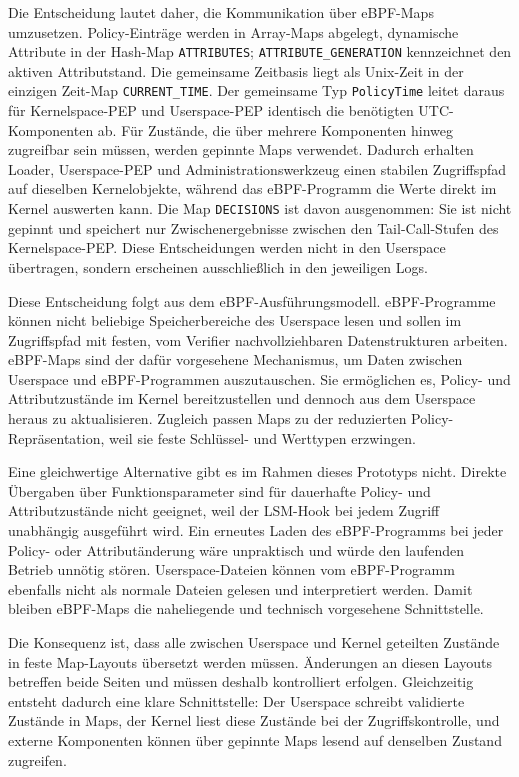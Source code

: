Die Entscheidung lautet daher, die Kommunikation über eBPF-Maps umzusetzen.
Policy-Einträge werden in Array-Maps abgelegt, dynamische Attribute in der Hash-Map
\texttt{ATTRIBUTES}; \texttt{ATTRIBUTE\_GENERATION} kennzeichnet den aktiven Attributstand. Die gemeinsame
Zeitbasis liegt als Unix-Zeit in der einzigen Zeit-Map \texttt{CURRENT\_TIME}. Der gemeinsame Typ
\texttt{PolicyTime} leitet daraus für Kernelspace-PEP und Userspace-PEP identisch die benötigten
UTC-Komponenten ab.
Für Zustände, die über mehrere Komponenten hinweg zugreifbar sein müssen, werden gepinnte Maps verwendet.
Dadurch erhalten Loader, Userspace-PEP und Administrationswerkzeug einen stabilen Zugriffspfad auf dieselben Kernelobjekte, während das eBPF-Programm die Werte direkt im Kernel auswerten kann.
Die Map \texttt{DECISIONS} ist davon ausgenommen: Sie ist nicht gepinnt und speichert nur
Zwischenergebnisse zwischen den Tail-Call-Stufen des Kernelspace-PEP. Diese Entscheidungen werden
nicht in den Userspace übertragen, sondern erscheinen ausschließlich in den jeweiligen Logs.

Diese Entscheidung folgt aus dem eBPF-Ausführungsmodell.
eBPF-Programme können nicht beliebige Speicherbereiche des Userspace lesen und sollen im Zugriffspfad mit festen, vom Verifier nachvollziehbaren Datenstrukturen arbeiten.
eBPF-Maps sind der dafür vorgesehene Mechanismus, um Daten zwischen Userspace und eBPF-Programmen auszutauschen.
Sie ermöglichen es, Policy- und Attributzustände im Kernel bereitzustellen und dennoch aus dem Userspace heraus zu aktualisieren.
Zugleich passen Maps zu der reduzierten Policy-Repräsentation, weil sie feste Schlüssel- und Werttypen erzwingen.

Eine gleichwertige Alternative gibt es im Rahmen dieses Prototyps nicht.
Direkte Übergaben über Funktionsparameter sind für dauerhafte Policy- und Attributzustände nicht geeignet, weil der LSM-Hook bei jedem Zugriff unabhängig ausgeführt wird.
Ein erneutes Laden des eBPF-Programms bei jeder Policy- oder Attributänderung wäre unpraktisch und würde den laufenden Betrieb unnötig stören.
Userspace-Dateien können vom eBPF-Programm ebenfalls nicht als normale Dateien gelesen und interpretiert werden.
Damit bleiben eBPF-Maps die naheliegende und technisch vorgesehene Schnittstelle.

Die Konsequenz ist, dass alle zwischen Userspace und Kernel geteilten Zustände in feste Map-Layouts übersetzt werden müssen.
Änderungen an diesen Layouts betreffen beide Seiten und müssen deshalb kontrolliert erfolgen.
Gleichzeitig entsteht dadurch eine klare Schnittstelle: Der Userspace schreibt validierte Zustände in Maps, der Kernel liest diese Zustände bei der Zugriffskontrolle, und externe Komponenten können über gepinnte Maps lesend auf denselben Zustand zugreifen.

